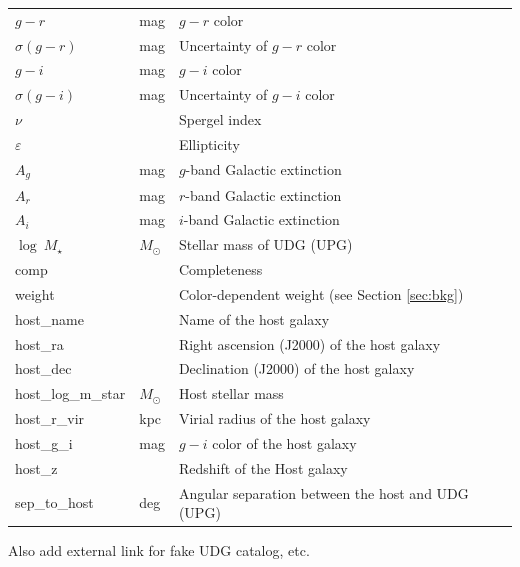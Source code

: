 \documentclass[twocolumn,astrosymb,twocolappendix]{aastex631}
\begin{document}
\begin{CJK*}{UTF8}{gbsn}
\begin{table}
\begin{center}
\begin{tabular}{l l l}
$g-r$                    & mag     & $g-r$ color                     \\
$\sigma(g-r)$            & mag     & Uncertainty of $g-r$ color      \\
$g-i$                    & mag     & $g-i$ color                     \\
$\sigma(g-i)$            & mag     & Uncertainty of $g-i$ color      \\
$\nu$                    &         & Spergel index              \\
$\varepsilon$            &         & Ellipticity                     \\
$A_g$                    & mag     & $g$-band Galactic extinction \\
$A_r$                    & mag     & $r$-band Galactic extinction \\
$A_i$                    & mag     & $i$-band Galactic extinction \\
$\log\ M_\star$ & $M_\odot$ & Stellar mass of UDG (UPG) \\
comp & & Completeness \\
weight & & Color-dependent weight (see Section \ref{sec:bkg}) \\
host\_name & & Name of the host galaxy \\
host\_ra & & Right ascension (J2000) of the host galaxy \\
host\_dec & & Declination (J2000) of the host galaxy \\
host\_log\_m\_star & $M_\odot$ & Host stellar mass\\
host\_r\_vir & kpc & Virial radius of the host galaxy \\
host\_g\_i & mag & $g-i$ color of the host galaxy \\
host\_z &  & Redshift of the Host galaxy \\
sep\_to\_host & deg & Angular separation between the host and UDG (UPG)\\
\hline\hline
\end{tabular}
\end{center}
\end{table}

Also add external link for fake UDG catalog, etc. 


\end{CJK*}
\end{document}
